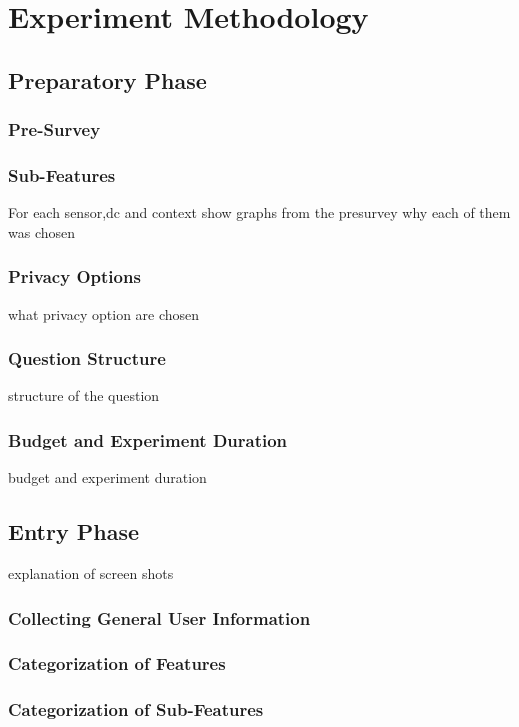 \chapter{Experiment Methodology}

\section{Preparatory Phase}

\subsection{Pre-Survey}

\subsection{Sub-Features}
For each sensor,dc and context show graphs from the presurvey why each of them was chosen

\subsection{Privacy Options}
what privacy option are chosen

\subsection{Question Structure}
structure of the question

\subsection{Budget and Experiment Duration}
budget and experiment duration


\section{Entry Phase}
explanation of screen shots

\subsection{Collecting General User Information}

\subsection{Categorization of Features}

\subsection{Categorization of Sub-Features}

